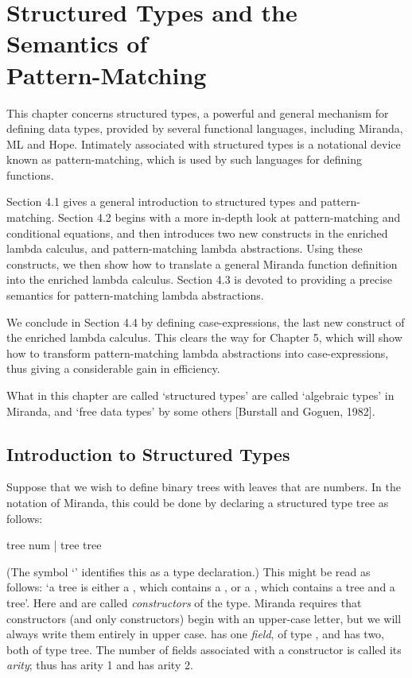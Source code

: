 \chapter[Structured Types and the Semantics of Pattern-Matching][Structured Types and the Semantics of Pattern-Matching]{Structured Types and the\\Semantics of\\Pattern-Matching}
\vspace{3cm}


\noindent This chapter concerns structured types, a powerful and general mechanism
for defining data types, provided by several functional languages, including
Miranda, ML and Hope. Intimately associated with structured types is a
notational device known as pattern-matching, which is used by such
languages for defining functions.

Section 4.1 gives a general introduction to structured types and pattern-matching. Section 4.2 begins with a more in-depth look at pattern-matching
and conditional equations, and then introduces two new constructs in the
enriched lambda calculus, \fatbar{} and pattern-matching lambda abstractions. Using
these constructs, we then show how to translate a general Miranda function
definition into the enriched lambda calculus. Section 4.3 is devoted to
providing a precise semantics for pattern-matching lambda abstractions.

We conclude in Section 4.4 by defining case-expressions, the last new
construct of the enriched lambda calculus. This clears the way for Chapter 5,
which will show how to transform pattern-matching lambda abstractions into
case-expressions, thus giving a considerable gain in efficiency.

What in this chapter are called `structured types' are called `algebraic types'
in Miranda, and `free data types' by some others [Burstall and Goguen, 1982].

\section{Introduction to Structured Types}

Suppose that we wish to define binary trees with leaves that are numbers. In the notation of Miranda, this could be done by declaring a structured type tree as follows:
\begin{mlcoded}
    tree \typedecl{}  num |  tree tree
\end{mlcoded}
(The symbol `\typedecl{}' identifies this as a type declaration.) This might be read as follows: `a tree is either a , which contains a , or a , which contains a tree and a tree'. Here  and  are called \textit{constructors} of the type. Miranda requires that constructors (and only constructors) begin with an upper-case letter, but we will always write them entirely in upper case.  has one \textit{field}, of type , and  has two, both of type tree. The number of fields associated with a constructor is called its \textit{arity}; thus  has arity 1 and  has arity 2.


